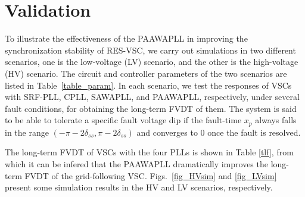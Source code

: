 \documentclass[10pt,final,journal,twoside]{IEEEtran}
\begin{document}
\section{Validation}\label{sec:valid}
To illustrate the effectiveness of the PAAWAPLL in improving the synchronization stability of RES-VSC, we carry out simulations in two different scenarios, one is the low-voltage (LV) scenario, and the other
is the high-voltage (HV) scenario. The circuit and controller parameters of the two scenarios are listed in Table~\ref{table_param}. In each scenario, we test the responses of VSCs with SRF-PLL, CPLL, SAWAPLL, and
PAAWAPLL, respectively, under several fault conditions, for obtaining the long-term FVDT of them. The system is said to be able to tolerate a specific fault voltage dip if the fault-time $x_p$ always falls
in the range $(-\pi-2\delta_{ss},\pi-2\delta_{ss})$ and converges to $0$ once the fault is resolved.
\begin{table}[H]
\caption{long-term FVDT of VSCs with SRF-PLL, CPLL, SAWAPLL and PAAWAPLL}
\label{tlf}
\centering
{}
\end{table}
The long-term FVDT of VSCs with the four PLLs is shown in Table \ref{tlf}, from which it can be infered that the PAAWAPLL dramatically improves the long-term FVDT of the grid-following VSC.
Figs.~\ref{fig_HVsim} and \ref{fig_LVsim} present some simulation results in the HV and LV scenarios, respectively.\par
\end{document}
